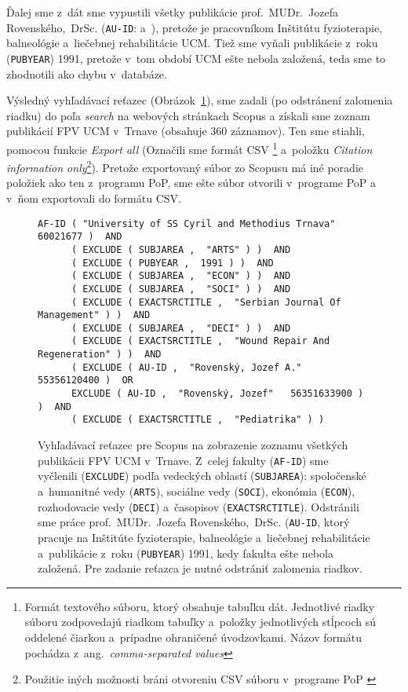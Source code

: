 Ďalej sme z~dát sme vypustili všetky publikácie prof.~MUDr.~Jozefa
Rovenského,~DrSc.  (\texttt{AU-ID}:  a~), pretože je pracovníkom Inštitútu fyzioterapie, balneológie
a~liečebnej rehabilitácie UCM.  Tiež sme vyňali publikácie z~roku
(\texttt{PUBYEAR}) 1991, pretože v~tom období UCM ešte nebola založená, teda sme
to zhodnotili ako chybu v~databáze.

Výsledný vyhľadávací reťazec (Obrázok~\ref{fig:scopus.query}), sme zadali (po
odstránení zalomenia riadku) do poľa \emph{search} na webových stránkach Scopus
a získali sme zoznam publikácií FPV UCM v~Trnave (obsahuje 360 záznamov).  Ten
sme stiahli, pomocou funkcie \emph{Export all} (Označili sme formát CSV%
\footnote{Formát textového súboru, ktorý obsahuje tabuľku dát.  Jednotlivé
  riadky súboru zodpovedajú riadkom tabuľky a~položky jednotlivých stĺpcoch sú
  oddelené čiarkou a~prípadne ohraničené úvodzovkami.  Názov formátu pochádza
  z~ang.~\emph{comma-separated values}} a~položku \emph{Citation information
  only}\footnote{Použitie iných možnosti bráni otvoreniu CSV súboru v~programe
  PoP \citep{Harzing2011}}).  Pretože exportovaný súbor zo Scopusu má iné
poradie položiek ako ten z~programu PoP, sme ešte súbor otvorili v~programe PoP
a v~ňom exportovali do formátu CSV.


\begin{figure}
  \footnotesize
  \begin{Verbatim}[frame=single]
    AF-ID ( "University of SS Cyril and Methodius Trnava"   60021677 )  AND
      ( EXCLUDE ( SUBJAREA ,  "ARTS" ) )  AND
      ( EXCLUDE ( PUBYEAR ,  1991 ) )  AND
      ( EXCLUDE ( SUBJAREA ,  "ECON" ) )  AND
      ( EXCLUDE ( SUBJAREA ,  "SOCI" ) )  AND
      ( EXCLUDE ( EXACTSRCTITLE ,  "Serbian Journal Of Management" ) )  AND
      ( EXCLUDE ( SUBJAREA ,  "DECI" ) )  AND
      ( EXCLUDE ( EXACTSRCTITLE ,  "Wound Repair And Regeneration" ) )  AND
      ( EXCLUDE ( AU-ID ,  "Rovenský, Jozef A."   55356120400 )  OR
      EXCLUDE ( AU-ID ,  "Rovenský, Jozef"   56351633900 ) )  AND
      ( EXCLUDE ( EXACTSRCTITLE ,  "Pediatrika" ) )
  \end{Verbatim}
  \vspace*{-4mm}
  \caption[Vyhľadávací reťazec pre celú fakultu pre Scopus]%
  {Vyhľadávací reťazec pre Scopus na zobrazenie zoznamu všetkých publikácii FPV
    UCM v~Trnave.  Z~celej fakulty (\texttt{AF-ID}) sme vyčlenili
    (\texttt{EXCLUDE}) podľa vedeckých oblastí (\texttt{SUBJAREA}): spoločenské
    a~humanitné vedy (\texttt{ARTS}), sociálne vedy (\texttt{SOCI}), ekonómia
    (\texttt{ECON}), rozhodovacie vedy (\texttt{DECI}) a~časopisov
    (\texttt{EXACTSRCTITLE}).  Odstránili sme práce prof.~MUDr.~Jozefa
    Rovenského,~DrSc.  (\texttt{AU-ID}, ktorý pracuje na Inštitúte
    fyzioterapie, balneológie a~liečebnej rehabilitácie a~publikácie z~roku
    (\texttt{PUBYEAR}) 1991, kedy fakulta ešte nebola založená.  Pre zadanie
    reťazca je nutné odstrániť zalomenia riadkov.}
  \label{fig:scopus.query}
\end{figure}


